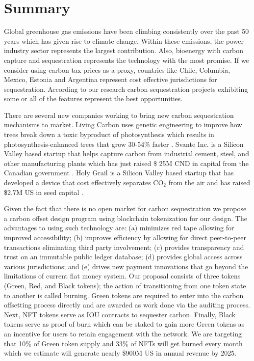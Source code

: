 \documentclass{article}
\begin{document}
\section{Summary}

Global greenhouse gas emissions have been climbing consistently over the past 50 years which has given rise to climate change. Within these emissions, the power industry sector represents the largest contribution. Also, bioenergy with carbon capture and sequestration represents the technology with the most promise. If we consider using carbon tax prices as a proxy, countries like Chile, Columbia, Mexico, Estonia and Argentina represent cost effective jurisdictions for sequestration. According to our research carbon sequestration projects exhibiting some or all of the features represent the best opportunities.

There are several new companies working to bring new carbon sequestration mechanisms to market. Living Carbon uses genetic engineering to improve how trees break down a toxic byproduct of photosynthesis which results in photosynthesis-enhanced trees that grow 30-54\% faster \cite{LC21}. Svante Inc. is a Silicon Valley based startup that helps capture carbon from industrial cement, steel, and other manufacturing plants which has just raised \$ 25M CND in capital from the Canadian government \cite{SA21}. Holy Grail is a Silicon Valley based startup that has developed a device that cost effectively separates CO$_{2}$ from the air and has raised \$2.7M US in seed capital \cite{HG21}.

Given the fact that there is no open market for carbon sequestration we propose a carbon offset design program using blockchain tokenization for our design. The advantages to using such technology are: (a) minimizes red tape allowing for improved accessibility; (b) improves efficiency by allowing for direct peer-to-peer transactions eliminating third party involvement; (c) provides transparency and trust on an immutable public ledger database; (d) provides global access across various jurisdictions; and (e) drives new payment innovations that go beyond the limitations of current fiat money system. Our proposal consists of three tokens (Green, Red, and Black tokens); the action of transitioning from one token state to another is called burning. Green tokens are required to enter into the carbon offsetting process directly and are awarded as work done via the auditing process. Next, NFT tokens serve as IOU contracts to sequester carbon. Finally, Black tokens serve as proof of burn which can be staked to gain more Green tokens as an incentive for users to retain engagement with the network. We are targeting that 10\% of Green token supply and 33\% of NFTs will get burned every month which we estimate will generate nearly \$900M US in annual revenue by 2025.
\end{document}

